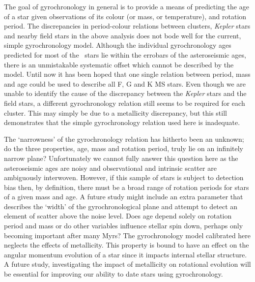 The goal of gyrochronology in general is to provide a means of predicting the
age of a star given observations of its colour (or mass, or temperature), and
rotation period.
The discrepancies in period-colour relations between clusters, {\it Kepler}
stars and nearby field stars in the above analysis does not bode well for the
current, simple gyrochronology model.
Although the individual gyrochronology ages predicted for most of the \kepler\
stars lie within the errobars of the asteroseismic ages, there is an
unmistakable systematic offset which cannot be described by the model.
Until now it has been hoped that one single relation between period, mass and
age could be used to describe all F, G and K MS stars.
Even though we are unable to identify the cause of the discrepancy between the
{\it Kepler} stars and the field stars, a different gyrochronology relation
still seems to be required for each cluster.
This may simply be due to a metallicity discrepancy, but this still
demonstrates that the simple gyrochronology relation used here is inadequate.

The `narrowness' of the gyrochronology relation has hitherto been an unknown;
do the three properties, age, mass and rotation period, truly lie on an
infinitely narrow plane?
Unfortunately we cannot fully answer this question here as the asteroseismic
ages are noisy and observational and intrinsic scatter are ambiguously
interwoven.
However, if this sample of stars is subject to detection bias then, by
definition, there must be a broad range of rotation periods for stars of a
given mass and age.
A future study might include an extra parameter that describes the `width' of
the gyrochronological plane and attempt to detect an element of scatter above
the noise level.
Does age depend solely on rotation period and mass or do other variables
influence stellar spin down, perhaps only becoming important after many Myrs?
The gyrochronology model calibrated here neglects the effects of metallicity.
This property is bound to have an effect on the angular momentum evolution
of a star since it impacts internal stellar structure.
A future study, investigating the impact of metallicity on rotational evolution
will be essential for improving our ability to date stars using gyrochronology.

